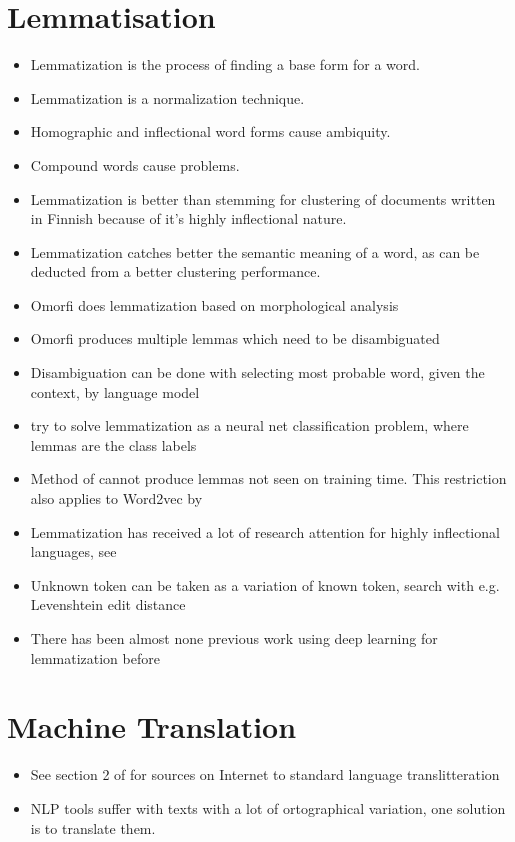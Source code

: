 \documentclass[12pt,a4paper,english
]{tutthesis}
\begin{document}
\section{Lemmatisation}
\label{se:lemmatisation}
\begin{itemize}
\item Lemmatization is the process of finding a base form for a word.
\item Lemmatization is a normalization technique. \cite{Korenius2004}
\item Homographic and inflectional word forms cause ambiquity. \cite{Korenius2004}
\item Compound words cause problems. \cite{Korenius2004}
\item Lemmatization is better than stemming for clustering of documents written in Finnish because of it's highly inflectional nature. \cite{Korenius2004}
\item Lemmatization catches better the semantic meaning of a word, as can be deducted from a better clustering performance.
\item Omorfi does lemmatization based on morphological analysis
\item Omorfi produces multiple lemmas which need to be disambiguated
\item Disambiguation can be done with selecting most probable word, given the context, by language model
\item \cite{Kestemont2016} try to solve lemmatization as a neural net classification problem, where lemmas are the class labels
\item Method of \cite{Kestemont2016} cannot produce lemmas not seen on training time. This restriction also applies to Word2vec by \cite{Mikolov2013}
\item Lemmatization has received a lot of research attention for highly inflectional languages, see \cite{Kestermont2016}
\item Unknown token can be taken as a variation of known token, search with e.g. Levenshtein edit distance
\item There has been almost none previous work using deep learning for lemmatization before \cite{Kestemont2016}
\end{itemize}

\section{Machine Translation}
\label{se:machine_translation}
\begin{itemize}
\item See section 2 of \cite{Kestemont2016} for sources on Internet to standard language translitteration
\item NLP tools suffer with texts with a lot of ortographical variation, one solution is to translate them. \cite{Kestemont2016}
\end{itemize}
\end{document}
